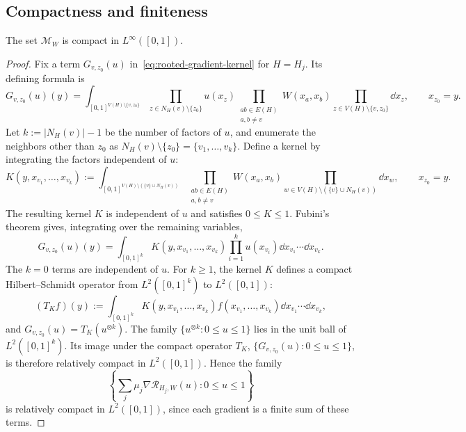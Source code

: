 \subsection{Compactness and finiteness}\label{sec:row-finiteness}

\begin{lemma}\label{lem:row-compact}
The set $\mathcal M_W$ is compact in $L^\infty([0,1])$.
\end{lemma}

\begin{proof}
Fix a term $G_{v,z_0}(u)$ in~\eqref{eq:rooted-gradient-kernel} for $H=H_j$.
Its defining formula is
\[
  G_{v,z_0}(u)(y)=\int_{[0,1]^{V(H)\setminus\{v,z_0\}}}
  \prod_{z\in N_H(v)\setminus\{z_0\}}u(x_z)
  \prod_{\substack{ab\in E(H)\\a,b\ne v}}W(x_a,x_b)
  \prod_{z\in V(H)\setminus\{v,z_0\}}\dd x_z,
  \qquad x_{z_0}=y.
\]
Let $k:=|N_H(v)|-1$ be the number of factors of $u$, and enumerate
the neighbors other than $z_0$ as
$N_H(v)\setminus\{z_0\}=\{v_1,\dots,v_k\}$.
Define a kernel by integrating the factors independent of $u$:
\[
  K(y,x_{v_1},\dots,x_{v_k}):=
  \int_{[0,1]^{V(H)\setminus(\{v\}\cup N_H(v))}}
  \prod_{\substack{ab\in E(H)\\a,b\ne v}}W(x_a,x_b)
  \prod_{w\in V(H)\setminus(\{v\}\cup N_H(v))}\dd x_w,
  \qquad x_{z_0}=y.
\]
The resulting kernel $K$ is independent of $u$ and satisfies $0\le K\le1$.
Fubini's theorem gives, integrating over the remaining variables,
\[
  G_{v,z_0}(u)(y)=\int_{[0,1]^k}K(y,x_{v_1},\dots,x_{v_k})
                   \prod_{i=1}^ku(x_{v_i})\dd x_{v_1}\cdots\dd x_{v_k}.
\]
The $k=0$ terms are independent of $u$.  For $k\ge1$, the kernel $K$ defines
a compact Hilbert--Schmidt operator from $L^2([0,1]^k)$ to $L^2([0,1])$:
\[
  (T_Kf)(y):=\int_{[0,1]^k}K(y,x_{v_1},\dots,x_{v_k})
    f(x_{v_1},\dots,x_{v_k})\dd x_{v_1}\cdots\dd x_{v_k},
\]
and $G_{v,z_0}(u)=T_K(u^{\otimes k})$.
The family $\{u^{\otimes k}:0\le u\le1\}$ lies in the unit ball of
$L^2([0,1]^k)$.  Its image under the compact operator $T_K$,
$\{G_{v,z_0}(u):0\le u\le1\}$, is therefore relatively compact in $L^2([0,1])$.
Hence the family
\[
  \left\{\sum_j\mu_j\nabla\mathcal R_{H_j,W}(u):
  0\le u\le1\right\}
\]
is relatively compact in $L^2([0,1])$, since each gradient is a finite sum of these terms.


\end{proof}
